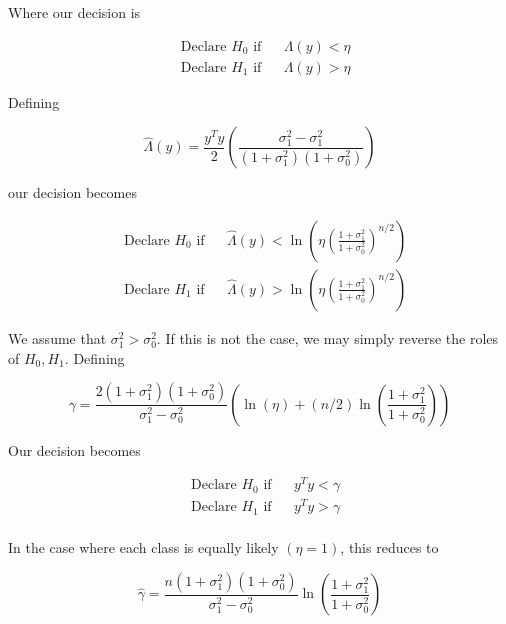 \documentclass[english]{article}
\begin{document}
Where our decision is

\begin{equation}
\begin{aligned}
&\text{Declare } H_0 \text{ if}
&& \Lambda(y) < \eta\\
& \text{Declare } H_1 \text{ if}
&& \Lambda(y) > \eta
\end{aligned}
\end{equation}

Defining

\begin{equation}
\hat{\Lambda}(y)=\frac{y^Ty}{2}\left(\frac{\sigma^2_1-\sigma^2_1}{(1+\sigma_1^2)(1+\sigma_0^2)}\right)
\end{equation}

our decision becomes

\begin{equation}
\begin{aligned}
&\text{Declare } H_0 \text{ if}
&& \hat{\Lambda}(y) < \ln\left(\eta\left(\frac{1+\sigma_1^2}{1+\sigma_0^2}\right)^{n/2}\right)\\
& \text{Declare } H_1 \text{ if}
&& \hat{\Lambda}(y) > \ln\left(\eta\left(\frac{1+\sigma_1^2}{1+\sigma_0^2}\right)^{n/2}\right)
\end{aligned}
\end{equation}

We assume that $\sigma_1^2>\sigma_0^2$. If this is not the case, we may simply reverse the roles of $H_0,H_1$. Defining

\begin{equation}
\gamma = \frac{2(1+\sigma_1^2)(1+\sigma_0^2)}{\sigma_1^2-\sigma_0^2}\left(\ln(\eta) +(n/2)\ln\left(\frac{1+\sigma_1^2}{1+\sigma_0^2}\right)\right)
\end{equation}

Our decision becomes

\begin{equation}
\begin{aligned}
&\text{Declare } H_0 \text{ if}
&& y^Ty < \gamma\\
& \text{Declare } H_1 \text{ if}
&& y^Ty > \gamma\\
\end{aligned}
\end{equation}

In the case where each class is equally likely $(\eta=1)$, this reduces to

\begin{equation}
\hat{\gamma} = \frac{n(1+\sigma_1^2)(1+\sigma_0^2)}{\sigma_1^2-\sigma_0^2}\ln\left(\frac{1+\sigma_1^2}{1+\sigma_0^2}\right)
\end{equation}
\end{document}

